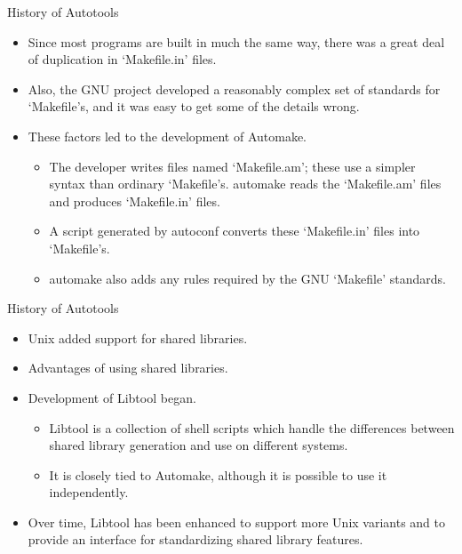 \documentclass{beamer}
\begin{document}
\begin{frame}{History of Autotools}
\begin{itemize}
	\item Since most programs are built in much the same way, there was a great deal of duplication in `Makefile.in' files.\pause
	\item Also, the GNU project developed a reasonably complex set of standards for `Makefile's, and it was easy to get some of the details wrong.\pause
	\item These factors led to the development of Automake.\pause
	\begin{itemize}
		\item The developer writes files named `Makefile.am'; these use a simpler syntax than ordinary `Makefile's. automake reads the `Makefile.am' files and produces `Makefile.in' files. \pause
		\item A script generated by autoconf converts these `Makefile.in' files into `Makefile's. \pause
		\item  automake also adds any rules required by the GNU `Makefile' standards. \pause
	\end{itemize}
\end{itemize}
\end{frame}


\begin{frame}{History of Autotools}
\begin{itemize}
	\item Unix added support for shared libraries.\pause
	\item Advantages of using shared libraries. \pause
	\item Development of Libtool began. \pause
	\begin{itemize}
		\item Libtool is a collection of shell scripts which handle the differences between shared library generation and use on different systems. 
		\item It is closely tied to Automake, although it is possible to use it independently. 
	\end{itemize}
	\item Over time, Libtool has been enhanced to support more Unix variants and to provide an interface for standardizing shared library features. 
\end{itemize}
\end{frame}
\end{document}
